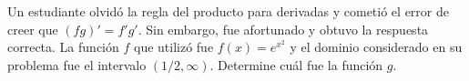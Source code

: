 \item Un estudiante olvidó la regla del producto para derivadas y cometió el error de creer que $(fg)' = f'g'$. Sin embargo, fue afortunado y obtuvo la respuesta correcta. La función $f$ que utilizó fue $f(x) = e^{x^2}$ y el dominio considerado en su problema fue el intervalo $(1/2, \infty)$. Determine cuál fue la función $g$.
